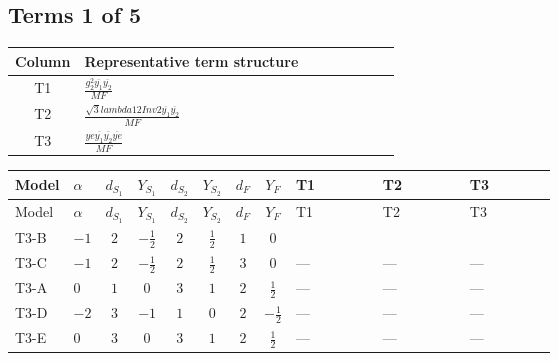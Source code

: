 \documentclass[8pt]{article}
\begin{document}
\begin{landscape}
\subsection*{Terms 1 of 5}
\begin{center}
\begin{tabular}{@{}c >{\raggedright\arraybackslash}p{0.82\linewidth}@{}}
\toprule
Column & Representative term structure \\
\midrule
T1 & \(\displaystyle \frac{g_{2}^{2} \overline{y_{1}} \overline{y_{2}}}{MF}\) \\
\midrule
T2 & \(\displaystyle \frac{\sqrt{3} lambda12Inv2 \overline{y_{1}} \overline{y_{2}}}{MF}\) \\
\midrule
T3 & \(\displaystyle \frac{ye \overline{y_{1}} \overline{y_{2}} \overline{ye}}{MF}\) \\
\midrule
\bottomrule
\end{tabular}
\end{center}
\smallskip
\tiny
\begin{longtable}{@{}llcccccc >{\raggedright\arraybackslash}p{0.21\linewidth} >{\raggedright\arraybackslash}p{0.21\linewidth} >{\raggedright\arraybackslash}p{0.21\linewidth}@{}}
\toprule
Model & $\alpha$ & $d_{S_1}$ & $Y_{S_1}$ & $d_{S_2}$ & $Y_{S_2}$ & $d_F$ & $Y_F$ & T1 & T2 & T3 \\
\midrule
\endfirsthead
\toprule
Model & $\alpha$ & $d_{S_1}$ & $Y_{S_1}$ & $d_{S_2}$ & $Y_{S_2}$ & $d_F$ & $Y_F$ & T1 & T2 & T3 \\
\midrule
\endhead
T3-B & $-1$ & $2$ & $-\frac{1}{2}$ & $2$ & $\frac{1}{2}$ & $1$ & $0$ & \scriptsize\adjustbox{max width=\linewidth}{$\begin{gathered} - \frac{3 g_{2}^{2} \overline{y_{1}} \overline{y_{2}}}{4 MF}\end{gathered}$} & \scriptsize\adjustbox{max width=\linewidth}{$\begin{gathered} - \frac{\sqrt{3} lambda12Inv2 \overline{y_{1}} \overline{y_{2}}}{3 MF}\end{gathered}$} & \scriptsize\adjustbox{max width=\linewidth}{$\begin{gathered} \frac{ye \overline{y_{1}} \overline{y_{2}} \overline{ye}}{4 MF}\end{gathered}$} \\
\midrule
T3-C & $-1$ & $2$ & $-\frac{1}{2}$ & $2$ & $\frac{1}{2}$ & $3$ & $0$ & --- & --- & --- \\
\midrule
T3-A & $0$ & $1$ & $0$ & $3$ & $1$ & $2$ & $\frac{1}{2}$ & --- & --- & --- \\
\midrule
T3-D & $-2$ & $3$ & $-1$ & $1$ & $0$ & $2$ & $-\frac{1}{2}$ & --- & --- & --- \\
\midrule
T3-E & $0$ & $3$ & $0$ & $3$ & $1$ & $2$ & $\frac{1}{2}$ & --- & --- & --- \\
\midrule
\bottomrule
\end{longtable}
\clearpage

\end{landscape}
\end{document}
